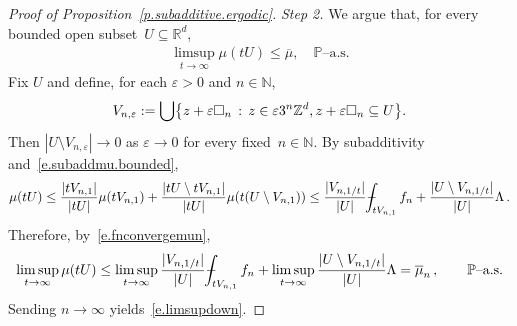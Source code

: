 \documentclass[11pt]{article} %
\let\oldsquare\square %
\renewcommand{\square}{\oldsquare}
\numberwithin{equation}{section}
\theoremstyle{definition}
\let\originalleft\left
\let\originalright\right
\renewcommand{\left}{\mathopen{}\mathclose\bgroup\originalleft}
\renewcommand{\right}{\aftergroup\egroup\originalright}
\newcommand*{\N}{\ensuremath{\mathbb{N}}}
\newcommand*{\Zd}{\ensuremath{\mathbb{Z}^d}}
\newcommand*{\Rd}{\ensuremath{\mathbb{R}^d}}
\newcommand{\eps}{\varepsilon}
\newcommand{\ep}{\eps}
\newcommand{\cu}{\square}
\renewcommand{\P}{\mathbb{P}}
\def\Xint#1{\mathchoice
{\XXint\displaystyle\textstyle{#1}}%
{\XXint\textstyle\scriptstyle{#1}}%
{\XXint\scriptstyle\scriptscriptstyle{#1}}%
{\XXint\scriptscriptstyle\scriptscriptstyle{#1}}%
\!\int}
\def\XXint#1#2#3{{\setbox0=\hbox{$#1{#2#3}{\int}$}
\vcenter{\hbox{$#2#3$}}\kern-.5\wd0}}
\def\fint{\Xint-}
\begin{document}
\begin{proof}[{Proof of Proposition~\ref{p.subadditive.ergodic}}]
\emph{Step 2.}
We argue that, for every bounded open subset~$U\subseteq\Rd$, 
\begin{align}
\label{e.limsupdown}
\limsup_{t\to \infty} \mu(t U) \leq \overline{\mu}, 
\quad \mbox{$\P$--a.s.}
\end{align}
Fix $U$ and define, for each $\ep>0$ and $n\in\N$, \begin{align*}
V_{n,\ep} := \bigcup \left\{ z+\ep \cu_n \,:\, z\in \ep3^n \Zd , z+\ep\cu_n \subseteq U \right\}. 
\end{align*}
Then $|U \setminus V_{n,\ep}| \to 0$ as $\ep \to 0$ for every fixed~$n\in\N$. 
By subadditivity and~\eqref{e.subaddmu.bounded},  
\begin{equation*}
\mu(tU)
\leq 
\frac{|tV_{n,1}|}{|tU|} \mu(tV_{n,1})+ \frac{|tU \setminus tV_{n,1}|}{|tU|}  \mu(t(U\setminus V_{n,1}))
\leq
\frac{|V_{n,1/t}|}{|U|} \fint_{tV_{n,1}} f_n +  \frac{|U \setminus V_{n,1/t}|}{|U|} \Lambda
\,.
\end{equation*}
Therefore, by~\eqref{e.fnconvergemun},
\begin{equation*}
\limsup_{t\to \infty} \mu(tU) 
\leq 
\limsup_{t\to \infty}
\frac{|V_{n,1/t}|}{|U|} \fint_{tV_{n,1}} f_n 
+ 
\limsup_{t\to \infty} \frac{|U \setminus V_{n,1/t}|}{|U|} \Lambda
=
\overline{\mu}_n
\,,
\qquad 
\mbox{$\P$--a.s.}
\end{equation*}
Sending $n\to \infty$ yields~\eqref{e.limsupdown}. 

\smallskip


\end{proof}
\end{document}

